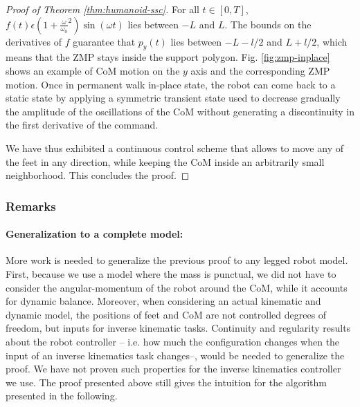 \documentclass{article}
\begin{document}
\begin{proof}[Proof of Theorem \ref{thm:humanoid-ssc}]
For    all     $t    \in    [0,T]$,    $f(t)     \epsilon    (1    +
\frac{\omega}{\omega_0}^2)  \sin  (\omega t)$  lies  between $-L$  and
$L$. The bounds on the derivatives of $f$ guarantee that $p_y(t)$ lies
between  $-L- l/2$ and  $L+ l/2$,  which means  that the  ZMP stays
inside  the  support  polygon.  Fig.  \ref{fig:zmp-inplace}  shows  an
example  of CoM  motion  on the  $y$  axis and  the corresponding  ZMP
motion. Once in permanent walk in-place state, the robot can come back
to  a static  state by  applying a  symmetric transient  state  used to
decrease  gradually  the amplitude  of  the  oscillations  of the  CoM
without  generating a  discontinuity in  the first  derivative  of the
command.


We have thus exhibited a continuous control scheme that allows to move any of the feet
in any direction, while keeping the CoM inside an arbitrarily small neighborhood. This concludes
the proof.
\end{proof}


\subsubsection{Remarks}
\paragraph{Generalization to a complete model:} More work is needed to generalize 
the previous proof to any legged robot model. First, because we use a model where
the mass is punctual, we did not have to consider the angular-momentum of the robot
around the CoM, while it accounts for dynamic balance. Moreover, when considering
an actual kinematic and dynamic model,
the positions of feet and CoM are not controlled degrees of freedom, but inputs 
for inverse kinematic tasks. Continuity and regularity results about the robot
controller -- i.e. how much the configuration changes when the input of an inverse
kinematics task changes--, would be needed to generalize the proof. We have not
proven such properties for the inverse kinematics controller we use. 
The  proof presented above still gives the intuition for the
algorithm presented in the following.
\end{document}
